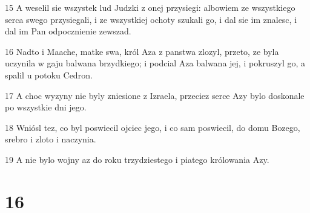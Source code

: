 \par 15 A weselil sie wszystek lud Judzki z onej przysiegi: albowiem ze wszystkiego serca swego przysiegali, i ze wszystkiej ochoty szukali go, i dal sie im znalesc, i dal im Pan odpocznienie zewszad.
\par 16 Nadto i Maache, matke swa, król Aza z panstwa zlozyl, przeto, ze byla uczynila w gaju balwana brzydkiego; i podcial Aza balwana jej, i pokruszyl go, a spalil u potoku Cedron.
\par 17 A choc wyzyny nie byly zniesione z Izraela, przeciez serce Azy bylo doskonale po wszystkie dni jego.
\par 18 Wniósl tez, co byl poswiecil ojciec jego, i co sam poswiecil, do domu Bozego, srebro i zloto i naczynia.
\par 19 A nie bylo wojny az do roku trzydziestego i piatego królowania Azy.

\chapter{16}

